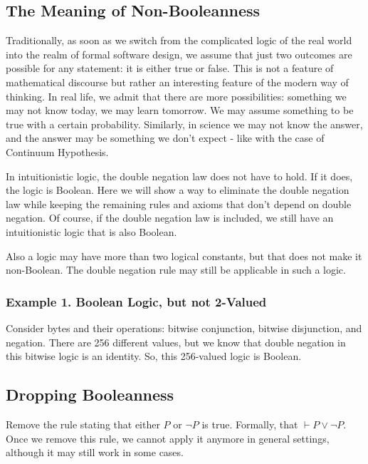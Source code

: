 \documentclass[10pt]{asme2ej}
\begin{document}
\subsection{The Meaning of Non-Booleanness}

Traditionally, as soon as we switch from the complicated logic of the real world into the realm of formal software design, we assume that just two outcomes are possible for any statement: it is either true or false. 
This is not a feature of mathematical discourse but rather an interesting feature of the modern way of thinking. 
In real life, we admit that there are more possibilities: something we may not know today, we may learn tomorrow. 
We may assume something to be true with a certain probability. 
Similarly, in science we may not know the answer, and the answer may be something we don't expect - like with the case of Continuum Hypothesis.

In intuitionistic logic, the double negation law does not have to hold. If it does, the logic is Boolean. Here we will show a way to eliminate the double negation law while keeping the remaining rules and axioms that don't depend on double negation.
Of course, if the double negation law is included, we still have an intuitionistic logic that is also Boolean.

Also a logic may have more than two logical constants, but that does not make it non-Boolean. 
The double negation rule may still be applicable in such a logic.

\subsubsection{Example 1. Boolean Logic, but not 2-Valued}

Consider bytes and their operations: bitwise conjunction, bitwise disjunction, and negation. There are 256 different values, but we know
that double negation in this bitwise logic is an identity. 
So, this 256-valued logic is Boolean.\\

\subsection{Dropping Booleanness}

Remove the rule stating that either $P$ or $\neg P$ is true.
Formally, that $\vdash P \lor \neg P$. Once we remove this rule, 
we cannot apply it anymore in general settings, although it may still work in some cases.
\end{document}

